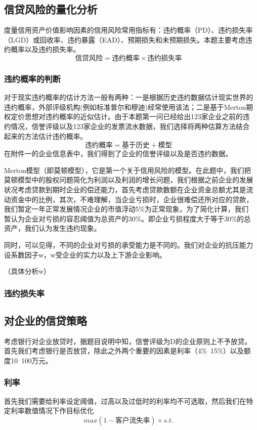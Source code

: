 \documentclass[UTF8]{ctexart}
\begin{document}
	\subsection{信贷风险的量化分析}
	度量信用资产价值影响因素的信用风险常用指标有：违约概率（PD）、违约损失率（LGD）或回收率、违约暴露（EAD）、预期损失和未预期损失。本题主要考虑违约概率以及违约损失率。
	\begin{equation}
	信贷风险=违约概率\times 违约损失率
	\end{equation}
	
	\subsubsection{违约概率的判断}
	对于现实违约概率的估计方法一般有两种：一是根据历史违约数据估计现实世界的违约概率，外部评级机构(例如标准普尔和穆迪)经常使用该法；二是基于Merton期权定价思想对违约概率的近似估计。由于本题第一问已经给出123家企业之前的违约情况，信誉评级以及123家企业的发票流水数据，我们选择将两种估算方法结合起来的方法估计违约概率。
	\begin{equation}
	违约概率=基于历史+模型
	\end{equation}
	在附件一的企业信息表中，我们得到了企业的信誉评级以及是否违约数据。
	
	Merton模型（即莫顿模型），它是第一个关于信用风险的模型。在此题中，我们把莫顿模型中的股权问题简化为利润以及利润的增长问题，我们根据之前企业的发展状况考虑贷款到期时企业的偿还能力，首先考虑贷款数额在企业资金总额尤其是流动资金中的比例，其次，不难理解，当企业亏损时，企业很难偿还所对应的贷款，我们暂定一年正常发展情况企业的市值浮动5$\%$为正常现象，为了简化计算，我们暂认为企业对亏损的容忍阈值为总资产的30$\%$。即企业亏损程度大于等于30$\%$的总资产，我们认为发生违约现象。
	
	同时，可以见得，不同的企业对亏损的承受能力是不同的。我们对企业的抗压能力设系数因子w，w受企业的实力以及上下游企业影响。
	
	（具体分析w）
	\subsubsection{违约损失率}
	
	\subsection{对企业的信贷策略}
	考虑银行对企业放贷时，据题目说明中知，信誉评级为D的企业原则上不予放贷。首先我们考虑银行是否放贷，除此之外两个重要的因素是利率（4$\%$~15$\%$）以及额度10~100万元。
	\subsubsection{利率}
	首先我们需要给利率设定阈值，过高以及过低时的利率均不可选取，然后我们在特定利率数值情况下作目标优化
	\begin{equation}
	max (1-客户流失率)\times
	s.t.  
	\end{equation}
	
\end{document}
